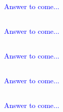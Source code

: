 \documentclass[a4paper,12pt]{article}
\begin{document}
\textcolor{blue}{
Answer to come...
}
\subsection{}

\textcolor{blue}{
Answer to come...
}
\subsection{}

\textcolor{blue}{
Answer to come...
}
\subsection{}

\textcolor{blue}{
Answer to come...
}
\subsection{}

\textcolor{blue}{
Answer to come...
}
\end{document}
